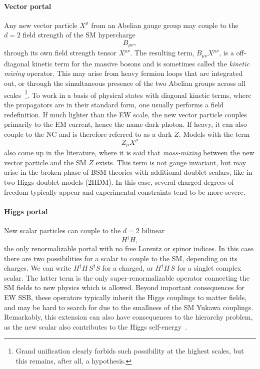 \paragraph{Vector portal} Any new vector particle $X^\mu$ from an Abelian gauge group may couple to the $d=2$ field strength of the SM hypercharge
\begin{equation}
B_{\mu\nu},
\end{equation}
through its own field strength tensor $X^{\mu\nu}$. The resulting term, $B_{\mu\nu} X^{\mu\nu}$, is a off-diagonal kinetic term for the massive bosons and is sometimes called the \emph{kinetic mixing} operator. This may arise from heavy fermion loops that are integrated out, or through the simultaneous presence of the two Abelian groups across all scales~\footnote{Grand unification clearly forbids such possibility at the highest scales, but this remains, after all, a hypothesis.}. To work in a basis of physical states with diagonal kinetic terms, where the propagators are in their standard form, one usually performs a field redefinition. If much lighter than the EW scale, the new vector particle couples primarily to the EM current, hence the name dark photon. If heavy, it can also couple to the NC and is therefore referred to as a dark $Z$. Models with the term 
%
\begin{equation}
 Z_\mu X^\mu 
\end{equation}
%
also come up in the literature, where it is said that \emph{mass-mixing} between the new vector particle and the SM $Z$ exists. This term is not gauge invariant, but may arise in the broken phase of BSM theories with additional doublet scalars, like in two-Higgs-doublet models (2HDM). In this case, several charged degrees of freedom typically appear and experimental constraints tend to be more severe.

\paragraph{Higgs portal} New scalar particles can couple to the $d=2$ bilinear 
%
\begin{equation}
 H^\dagger H,
\end{equation}
%
the only renormalizable portal with no free Lorentz or spinor indices. In this case there are two possibilities for a scalar to couple to the SM, depending on its charges. We can write  $H^\dagger H \, S^\dagger S$ for a charged, or $H^\dagger H\, S $ for a singlet complex scalar. The latter term is the only super-renormalizable operator connecting the SM fields to new physics which is allowed. Beyond important consequences for EW SSB, these operators typically inherit the Higgs couplings to matter fields, and may be hard to search for due to the smallness of the SM Yukawa couplings. Remarkably, this extension can also have consequences to the hierarchy problem, as the new scalar also contributes to the Higgs self-energy~\cite{Craig:2013xia}.

